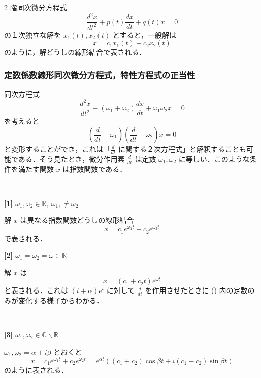 \documentclass[dvipdfmx, a4paper]{jsarticle}
\newcommand{\R}{\mathbb{R}}
\newcommand{\C}{\mathbb{C}}
\begin{document}
2 階同次微分方程式
\begin{equation}
    \frac{d^2 x}{dt^2}+p(t)\frac{dx}{dt}+q(t)x=0
\end{equation}
の１次独立な解を $x_1(t), x_2(t)$ とすると，一般解は
\begin{equation}
    x=c_1x_1(t)+c_2x_2(t)
\end{equation}
のように，解どうしの線形結合で表される．

\subsubsection{定数係数線形同次微分方程式，特性方程式の正当性}

同次方程式
\begin{equation}
    \frac{d^2x}{dt^2}-(\omega_1+\omega_2)\frac{dx}{dt}+\omega_1\omega_2 x=0
\end{equation}
を考えると
\begin{equation}
    \left(\frac{d}{dt}-\omega_1\right)\left(\frac{d}{dt}-\omega_2\right)x=0
\end{equation}
と変形することができ，これは「$\frac{d}{dt}$ に関する２次方程式」と解釈することも可能である．そう見たとき，微分作用素 $\frac{d}{dt}$ は定数 $\omega_1, \omega_2$ に等しい．このような条件を満たす関数 $x$ は指数関数である．

　

\noindent
\textbf{[1] $\omega_1, \omega_2\in\R,\ \omega_1,\neq\omega_2$}

解 $x$ は異なる指数関数どうしの線形結合
\begin{equation}
    x=c_1e^{\omega_1 t}+c_2e^{\omega_2t}
\end{equation}
で表される．

\noindent
\textbf{[2] $\omega_1=\omega_2=\omega\in\R$}

解 $x$ は
\begin{equation}
    x=(c_1+c_2t)e^{\omega t}
\end{equation}
と表される．これは $(t+\alpha)e^t$ に対して $\frac{d}{dt}$ を作用させたときに () 内の定数のみが変化する様子からわかる．

　

\noindent
\textbf{[3] $\omega_1, \omega_2\in\C\backslash\R$}

$\omega_1, \omega_2=\alpha\pm i\beta$ とおくと
\begin{equation}
    x=c_1e^{\omega_1t}+c_2e^{\omega_2t}=e^{\alpha t}((c_1+c_2)\cos\beta t+i(c_1-c_2)\sin\beta t)
\end{equation}
のように表される．
\end{document}
